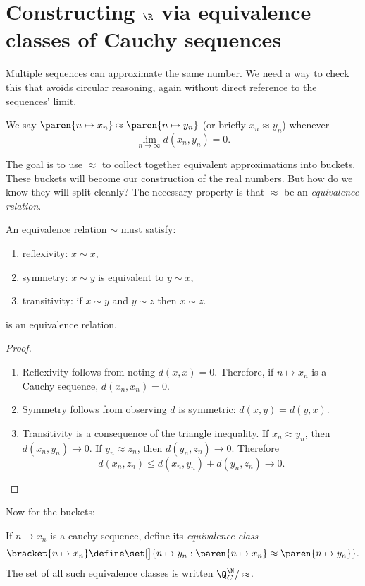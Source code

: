 \documentclass{scrartcl}
\newcommand{\dist}{d}
\begin{document}
\section{Constructing \(\R\) via equivalence classes of Cauchy sequences}
Multiple sequences can approximate the same number. We need a way to check this that avoids circular reasoning, again without direct reference to the sequences' limit.
\begin{defn}[\(\approx\)]\label{cauchy-eq}
  We say \(\paren{n\mapsto x_{n}}\approx\paren{n\mapsto  y_{n}}\) (or briefly \(x_{n}\approx y_{n}\)) whenever
  \[
    \lim_{{n\to\infty}} \dist(x_{n},y_{n}) = 0.
  \]
\end{defn}

The goal is to use \(\approx\) to collect together equivalent approximations into buckets. These buckets will become our construction of the real numbers. But how do we know they will split cleanly? The necessary property is that \(\approx\) be an \emph{equivalence relation}.
\begin{defn}
  An equivalence relation \(\sim\) must satisfy:
  \begin{enumerate}
    \item reflexivity: \(x\sim x\),
    \item symmetry: \(x\sim y\) is equivalent to \(y\sim x\),
    \item transitivity: if \(x\sim y\) and \(y \sim z\) then \(x\sim z\).
  \end{enumerate}
\end{defn}
\begin{theorem}
   is an equivalence relation.
\end{theorem}
\begin{proof}
  \phantom{M}
  \begin{enumerate}
    \item Reflexivity follows from noting \(\dist(x,x)=0\). Therefore, if \(n \mapsto x_{n}\) is a Cauchy sequence, \(\dist(x_{n},x_{n})=0\).

    \item Symmetry follows from observing \(\dist\) is symmetric: \(\dist(x,y)=\dist(y,x)\).
    \item Transitivity is a consequence of the triangle inequality.
          If \(x_{n}\approx y_{n}\), then \(\dist(x_{n},y_{n})\to 0\). If \(y_{n}\approx z_{n}\), then \(\dist(y_{n},z_{n})\to 0\). Therefore
          \[
          \dist(x_{n},z_{n}) \leq \dist(x_{n},y_{n}) + \dist(y_{n},z_{n}) \to 0.
          \]
  \end{enumerate}
\end{proof}
Now for the buckets:
\begin{defn}
  If \(n\mapsto x_{n}\) is a cauchy sequence, define its \emph{equivalence class}
  \[
    \bracket{n\mapsto x_{n}} \define \set[\big]{n\mapsto y_{n}: \paren{n\mapsto x_{n}}\approx \paren{n\mapsto y_{n}}}.
  \]
  The set of all such equivalence classes is written \(\Q^{\N}_{C}/\approx\).
\end{defn}
\end{document}

